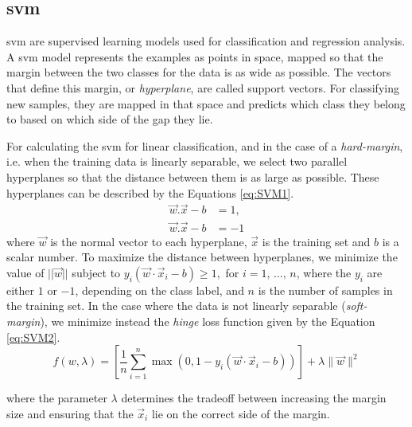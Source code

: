 \subsection{\acl{svm}}
\label{ssec:SuportVectorMachines}

\ac{svm} \cite{cortes1995support} are supervised learning models used for classification and regression analysis. A \ac{svm} model represents the examples as points in space, mapped so that the margin between the two classes for the data is as wide as possible. The vectors that define this margin, or \textit{hyperplane}, are called support vectors. For classifying new samples, they are mapped in that space and predicts which class they belong to based on which side of the gap they lie.

For calculating the \ac{svm} for linear classification, and in the case of a \textit{hard-margin}, i.e. when the training data is linearly separable, we select two parallel hyperplanes so that the distance between them is as large as possible.
These hyperplanes can be described by the Equations \ref{eq:SVM1}.
\begin{equation}
\label{eq:SVM1}
\begin{split}
\vec{w}.\vec{x}-b&=1, \\
\vec{w}.\vec{x}-b&=-1
\end{split}
\end{equation}
where $\vec{w}$ is the normal vector to each hyperplane, $\vec{x}$ is the training set and $b$ is a scalar number.
To maximize the distance between hyperplanes, we minimize the value of $||\vec{w}||$ subject to ${\displaystyle y_{i}({\vec {w}}\cdot {\vec {x}}_{i}-b)\geq 1,}$ for ${\displaystyle i=1,\,\ldots ,\,n} $, where the $y_{i}$ are either $1$ or $-1$, depending on the class label, and $n$ is the number of samples in the training set.
In the case where the data is not linearly separable (\textit{soft-margin}), we minimize instead the \textit{hinge} loss function given by the Equation \ref{eq:SVM2}.
\begin{equation}
\label{eq:SVM2}
f(w,\lambda)={\displaystyle \left[{\frac {1}{n}}\sum _{i=1}^{n}\max \left(0,1-y_{i}({\vec {w}}\cdot {\vec {x}}_{i}-b)\right)\right]+\lambda \lVert {\vec {w}}\rVert ^{2}}
\end{equation}

where the parameter $\lambda$ determines the tradeoff between increasing the margin size and ensuring that the ${\vec {x}}_{i}$ lie on the correct side of the margin.

